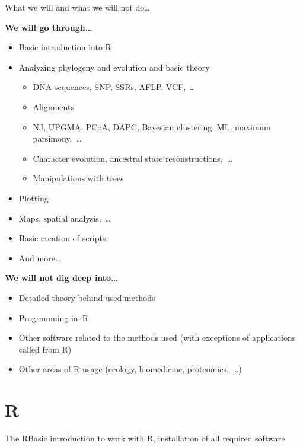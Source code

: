 \documentclass[compress, ucs, xelatex, 11pt, xcolor=svgnames, aspectratio=169,
	hyperref={
		bookmarks=true,
		unicode=true,
		colorlinks=true,
		pdftitle={Molecular data in R},
		plainpages=false,
		pdfauthor={Vojtech Zeisek},
		pdfsubject={Course about phylogeny and evolution in R},
		pdfcreator={XeLaTeX},
		pdfkeywords={R, evolution, phylogeny, molecular data},
		linkcolor=Crimson, %
		anchorcolor=Magenta, %
		citecolor=Magenta, %
		filecolor=Magenta, %
		menucolor=Magenta, %
		urlcolor=DodgerBlue, %
		pdftex},
	url={hyphens, lowtilde} %
	]{beamer}
\begin{document}
\begin{frame}{What we will and what we will not do\ldots}
	\begin{multicols}{2}
		\textbf{We will go through\ldots}
		\begin{itemize}
			\item Basic introduction into R
			\item Analyzing phylogeny and evolution and basic theory
			\begin{itemize}
				\item DNA sequences, SNP, SSRs, AFLP, VCF,~\ldots
				\item Alignments
				\item NJ, UPGMA, PCoA, DAPC, Bayesian clustering, ML, maximum parsimony,~\ldots
				\item Character evolution, ancestral state reconstructions,~\ldots
				\item Manipulations with trees
			\end{itemize}
			\item Plotting
		\columnbreak
			\item Maps, spatial analysis,~\ldots
			\item Basic creation of scripts
			\item And more\ldots
		\end{itemize}
		\textbf{We will not dig deep into\ldots}
		\begin{itemize}
			\item Detailed theory behind used methods
			\item Programming in~R
			\item Other software related to the methods used (with exceptions of applications called from R)
			\item Other areas of R usage (ecology, biomedicine, proteomics,~\ldots)
		\end{itemize}
	\end{multicols}
\end{frame}

\section{R}

\begin{frame}{The R}{Basic introduction to work with R, installation of all required software}
	\tableofcontents[currentsection, sectionstyle=show/hide, hideothersubsections]
\end{frame}
\end{document}
